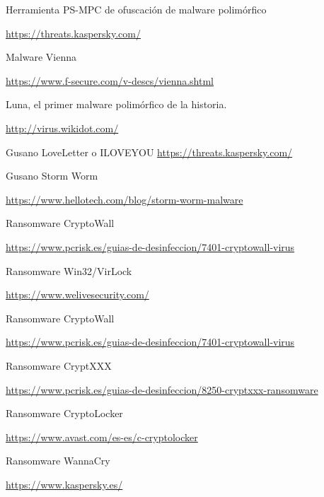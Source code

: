 \documentclass[15pt]{article}
\begin{document}
\begin{thebibliography}{40}
		Herramienta PS-MPC de ofuscación de malware polimórfico
		
		\href{https://threats.kaspersky.com/en/threat/Constructor.DOS.VCL/}{https://threats.kaspersky.com/}
		
		Malware Vienna
		
		\href{https://www.f-secure.com/v-descs/vienna.shtml}{https://www.f-secure.com/v-descs/vienna.shtml}
		
		Luna, el primer malware polimórfico de la historia.
		
		\href{http://virus.wikidot.com/luna#toc2}{http://virus.wikidot.com/}
		
		Gusano	LoveLetter o ILOVEYOU
		\href{https://threats.kaspersky.com/mx/threat/Email-Worm.VBS.LoveLetter/}{https://threats.kaspersky.com/}
		
		Gusano Storm Worm
		
		\href{https://www.hellotech.com/blog/storm-worm-malware}{https://www.hellotech.com/blog/storm-worm-malware}
		
		Ransomware CryptoWall
		
		\href{https://www.pcrisk.es/guias-de-desinfeccion/7401-cryptowall-virus}{https://www.pcrisk.es/guias-de-desinfeccion/7401-cryptowall-virus}
		
		
		Ransomware Win32/VirLock
		
		\href{https://www.welivesecurity.com/la-es/2014/12/22/virlock-primer-ransomware-reproduce/}{https://www.welivesecurity.com/}
		
		
		Ransomware CryptoWall
		
		\href{https://www.pcrisk.es/guias-de-desinfeccion/7401-cryptowall-virus}{https://www.pcrisk.es/guias-de-desinfeccion/7401-cryptowall-virus}
		
		Ransomware CryptXXX
		
		\href{https://www.pcrisk.es/guias-de-desinfeccion/8250-cryptxxx-ransomware}{https://www.pcrisk.es/guias-de-desinfeccion/8250-cryptxxx-ransomware}
		
		Ransomware CryptoLocker
		
		\href{https://www.avast.com/es-es/c-cryptolocker}{https://www.avast.com/es-es/c-cryptolocker}
		
		Ransomware WannaCry
		
		\href{https://www.kaspersky.es/resource-center/threats/ransomware-wannacry}{https://www.kaspersky.es/}
		

\end{thebibliography}
\end{document}
